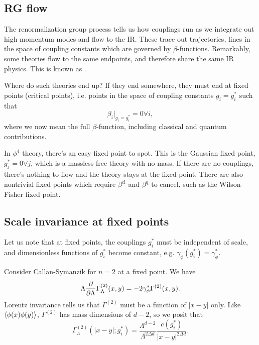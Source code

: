 \subsection*{RG flow}
The renormalization group process tells us how couplings run as we integrate out high momentum modes and flow to the IR. These trace out trajectories, lines in the space of coupling constants which are governed by $\beta$-functions. Remarkably, some theories flow to the same endpoints, and therefore share the same IR physics. This is known as .

Where do such theories end up? If they end somewhere, they must end at fixed points (critical points), i.e. points in the space of coupling constants $g_i=g_i^*$ such that
\begin{equation}
    \beta_i|_{g_i=g_i^*}=0 \forall i,
\end{equation}
where we now mean the full $\beta$-function, including classical and quantum contributions.

In $\phi^4$ theory, there's an easy fixed point to spot. This is the Gaussian fixed point, $g_j^*=0 \forall j$, which is a massless free theory with no mass. If there are no couplings, there's nothing to flow and the theory stays at the fixed point. There are also nontrivial fixed points which require $\beta^\text{cl}$ and $\beta^\text{q}$ to cancel, such as the Wilson-Fisher fixed point.

\subsection*{Scale invariance at fixed points} Let us note that at fixed points, the couplings $g_i^*$ must be independent of scale, and dimensionless functions of $g_i^*$ become constant, e.g. $\gamma_\phi(g_i^*)=\gamma_\phi^*$.

Consider Callan-Symanzik for $n=2$ at a fixed point. We have
\begin{equation}
    \Lambda \P{}{\Lambda} \Gamma_\Lambda^{(2)}(x,y) = -2 \gamma_\phi^* \Gamma^{(2)} (x,y).
\end{equation}
Lorentz invariance tells us that $\Gamma^{(2)}$ must be a function of $|x-y|$ only. Like $\avg{\phi(x)\phi(y)}$, $\Gamma^{(2)}$ has mass dimensions of $d-2$, so we posit that
\begin{equation}
    \Gamma_\Lambda^{(2)}(|x-y|; g_i^*) =\frac{\Lambda^{d-2}}{\Lambda^{2\Delta d}} \frac{c(g_i^*)}{|x-y|^{2\Delta d}}.
\end{equation}
